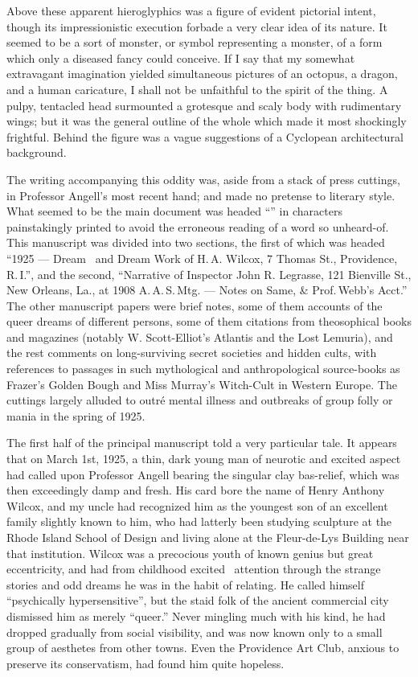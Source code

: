 Above these apparent hieroglyphics was a figure of evident pictorial
intent, though its impressionistic execution forbade a very clear idea
of its nature. It seemed to be a sort of monster, or symbol representing
a monster, of a form which only a diseased fancy could conceive. If I
say that my somewhat extravagant imagination yielded simultaneous
pictures of an octopus, a dragon, and a human caricature, I shall not be
unfaithful to the spirit of the thing. A pulpy, tentacled head
surmounted a grotesque and scaly body with rudimentary wings; but it was
the general outline of the whole which made it most shockingly
frightful. Behind the figure was a vague suggestions of a Cyclopean
architectural background.

The writing accompanying this oddity was, aside from a stack of press
cuttings, in Professor Angell's most recent hand; and made no pretense
to literary style. What seemed to be the main document was headed
``'' in characters painstakingly printed to avoid the
erroneous reading of a word so unheard-of. This manuscript was divided
into two sections, the first of which was headed ``1925 --- Dream \est\
and
Dream Work of H.\,A. Wilcox, 7 Thomas St., Providence, R.\,I.'', and the
second, ``Narrative of Inspector John R. Legrasse, 121 Bienville St.,
New Orleans, La., at 1908 A.\,A.\,S.\,Mtg. --- Notes on Same, \& Prof.\,Webb's
Acct.'' The other manuscript papers were brief notes, some of them
accounts of the queer dreams of different persons, some of them
citations from theosophical books and magazines (notably W.
Scott-Elliot's Atlantis and the Lost Lemuria), and the rest comments on
long-surviving secret societies and hidden cults, with references to
passages in such mythological and anthropological source-books as
Frazer's Golden Bough and Miss Murray's Witch-Cult in Western Europe.
The cuttings largely alluded to outré mental illness and outbreaks of
group folly or mania in the spring of 1925.

The first half of the principal manuscript told a very particular tale.
It appears that on March 1st, 1925, a thin, dark young man of neurotic
and excited aspect had called upon Professor Angell bearing the singular
clay bas-relief, which was then exceedingly damp and fresh. His card
bore the name of Henry Anthony Wilcox, and my uncle had recognized him
as the youngest son of an excellent family slightly known to him, who
had latterly been studying sculpture at the Rhode Island School of
Design and living alone at the Fleur-de-Lys Building near that
institution. Wilcox was a precocious youth of known genius but great
eccentricity, and had from childhood excited \est\ attention through the
strange stories and odd dreams he was in the habit of relating. He
called himself ``psychically hypersensitive'', but the staid folk of the
ancient commercial city dismissed him as merely ``queer.'' Never
mingling much with his kind, he had dropped gradually from social
visibility, and was now known only to a small group of aesthetes from
other towns. Even the Providence Art Club, anxious to preserve its
conservatism, had found him quite hopeless.

